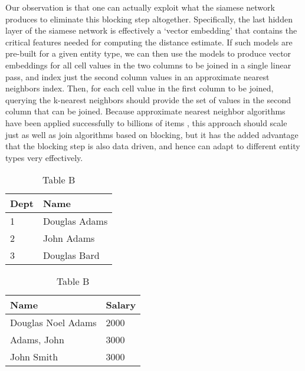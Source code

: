 Our observation is that one can actually exploit what the siamese network produces to eliminate this blocking step altogether.  Specifically, the last hidden layer of the siamese network is effectively a `vector embedding' that contains the critical features needed for computing the distance estimate.  If such models are pre-built for a given entity type, we can then use the models to produce vector embeddings for all cell values in the two columns to be joined in a single linear pass, and index just the second column values in an approximate nearest neighbors index.  Then, for each cell value in the first column to be joined, querying the k-nearest neighbors should provide the set of values in the second column that can be joined.  Because approximate nearest neighbor algorithms have been applied successfully to billions of items \cite{JDH17}, this approach should scale just as well as join algorithms based on blocking, but it has the added advantage that the blocking step is also data driven, and hence can adapt to different entity types very effectively.

\begin{table}[!htb]
    \caption{Example of a merge problem}
    \begin{subtable}{.5\linewidth}
      \centering
        \caption{Table A}
        \begin{tabular}{|l|l|}
          \hline
           Dept & Name \\
           \hline
           1    & Douglas Adams \\
           2    & John Adams \\
           3  & Douglas Bard \\
           \hline
        \end{tabular}
    \end{subtable}%
    \begin{subtable}{.5\linewidth}
      \centering
        \caption{Table B}
        \begin{tabular}{|l|l|}
          \hline
           Name & Salary \\
           \hline
           Douglas Noel Adams & 2000 \\
           Adams, John & 3000 \\
           John Smith & 3000 \\
           \hline
        \end{tabular}
    \end{subtable}
    \label{table-example}
\end{table}

